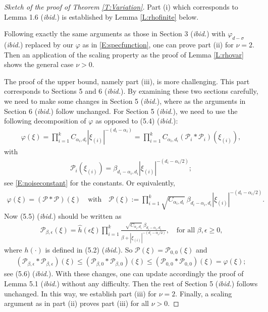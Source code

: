 \documentclass[a4paper,11pt]{article}
\numberwithin{equation}{section}
\numberwithin{equation}{section}
\theoremstyle{plain}
\theoremstyle{definition}
\begin{document}
\begin{proof}[Sketch of the proof of Theorem \ref{T:Variation}]
  Part (i) which corresponds to Lemma 1.6 ({\it ibid.}) is established by Lemma \ref{L:rhofinite}
  below.

  Following exactly the same arguments as those in Section 3 ({\it ibid.}) with $\varphi_{d-\sigma}$
  ({\it ibid.}) replaced by our $\varphi$ as in \eqref{E:specfunction}, one can prove part (ii) for
  $\nu=2$. Then an application of the scaling property as the proof of Lemma \ref{L:rhovar} shows
  the general case $\nu >0$.

  The proof of the upper bound, namely part (iii), is more challenging. This part corresponds to
  Sections 5 and 6 ({\it ibid.}). By examining these two sections carefully, we need to make some
  changes in Section 5 ({\it ibid.}), where as the arguments in Section 6 ({\it ibid.}) follow
  unchanged. For Section 5 ({\it ibid.}), we need to use the following decomposition of $\varphi$ as
  opposed to (5.4) ({\it ibid.}):
  \begin{align*}
    \varphi(\xi) = \prod_{i=1}^k C_{\alpha_i,d_i} |\xi_{(i)}|^{-(d_i-\alpha_i)}
    = \prod_{i=1}^k C_{\alpha_i,d_i} (\mathcal{P}_i*\mathcal{P}_i) \left(\xi_{(i)}\right),
  \end{align*}
  with
  \begin{align*}
    \mathcal{P}_i\left(\xi_{(i)}\right)=\beta_{d_i-\alpha_i,d_i}\left|\xi_{(i)}\right|^{-(d_i-\alpha_i / 2)};
  \end{align*}
  see \eqref{E:noiseconstant} for the constants. Or equivalently,
  \begin{align*}
    \varphi(\xi)      = \left(\mathcal{P} * \mathcal{P}\right)(\xi) \quad \text{with} \quad
    \mathcal{P}(\xi) := \prod_{i=1 }^{k} \sqrt{C_{\alpha_i,d_i}}\: \beta_{d_i-\alpha_i,d_i} \left|\xi_{(i)}\right|^{-(d_i-\alpha_i / 2)}.
  \end{align*}
  Now (5.5) ({\it ibid.}) should be written as
  \begin{align*}
    \mathcal{P}_{\beta,\epsilon}(\xi)
    = \hat{h}(\epsilon \xi) \prod_{i=1 }^{k} \frac{\sqrt{C_{\alpha_i,d_i}}\: \beta_{d_i-\alpha_i,d_i} }{\beta+\left|\xi_{(i)}\right|^{-(d_i-\alpha_i / 2)}},
    \quad \text{for all $\beta,\epsilon \ge 0$,}
  \end{align*}
  where $h(\cdot)$ is defined in (5.2) ({\it ibid.}).  So $\mathcal{P}(\xi) =
  \mathcal{P}_{0,0}(\xi)$ and
  \begin{align*}
    \left(\mathcal{P}_{\beta,\epsilon}*\mathcal{P}_{\beta,\epsilon}\right)(\xi) \le
    \left(\mathcal{P}_{\beta,0}*\mathcal{P}_{\beta,0}\right)(\xi) \le
    \left(\mathcal{P}_{0,0}*\mathcal{P}_{0,0}\right)(\xi) = \varphi(\xi);
  \end{align*}
  see (5.6) ({\it ibid.}). With these changes, one can update accordingly the proof of Lemma 5.1
  ({\it ibid.}) without any difficulty. Then the rest of Section 5 ({\it ibid.}) follows unchanged.
  In this way, we establish part (iii) for $\nu=2$. Finally, a scaling argument as in part (ii)
  proves part (iii) for all $\nu>0$.


\end{proof}
\end{document}
